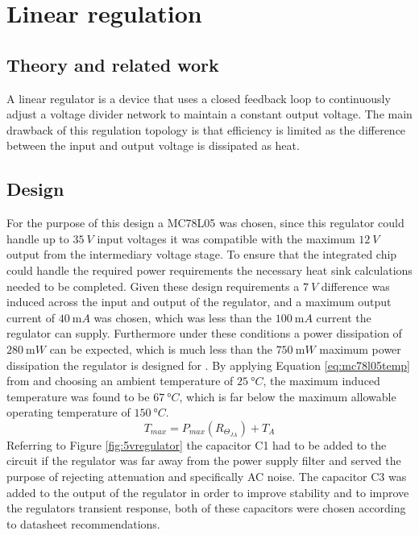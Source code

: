 \chapter{Linear regulation}
\section{Theory and related work} \label{sec:literature_linear}
A linear regulator is a device that uses a closed feedback loop to continuously adjust a voltage divider network to maintain a constant output voltage. The main drawback of this regulation topology is that efficiency is limited as the difference between the input and output voltage is dissipated as heat.

\section{Design} \label{sec:design_linear}
For the purpose of this design a MC78L05 was chosen, since this regulator could handle up to $\SI{35}{V}$ input voltages it was compatible with the maximum $\SI{12}{V}$ output from the intermediary voltage stage. To ensure that the integrated chip could handle the required power requirements the necessary heat sink calculations needed to be completed. \newline 
Given these design requirements a $\SI{7}{V}$ difference was induced across the input and output of the regulator, and a maximum output current of $\SI{40}{\milli A}$ was chosen, which was less than the $\SI{100}{\milli A}$ current the regulator can supply. Furthermore under these conditions a power dissipation of $\SI{280}{\milli W}$ can be expected, which is much less than the $\SI{750}{\milli W}$ maximum power dissipation the regulator is designed for \cite{reg78L05:2002}. By applying Equation \ref{eq:mc78l05temp} from \cite{Perold:2019} and choosing an ambient temperature of $\SI{25}{\degree C}$, the maximum induced temperature was found to be $\SI{67}{\degree C}$, which is far below the maximum allowable operating temperature of $\SI{150}{\degree C}$.\newline
\begin{equation}
   T_{max} = P_{max}(R_{\Theta _{JA}}) + T_{A}
   \label{eq:mc78l05temp}
\end{equation}
Referring to Figure \ref{fig:5vregulator} the capacitor C1 had to be added to the circuit if the regulator was far away from the power supply filter and served the purpose of rejecting attenuation and specifically AC noise. The capacitor C3 was added to the output of the regulator in order to improve stability and to improve the regulators transient response, both of these capacitors were chosen according to datasheet recommendations.

